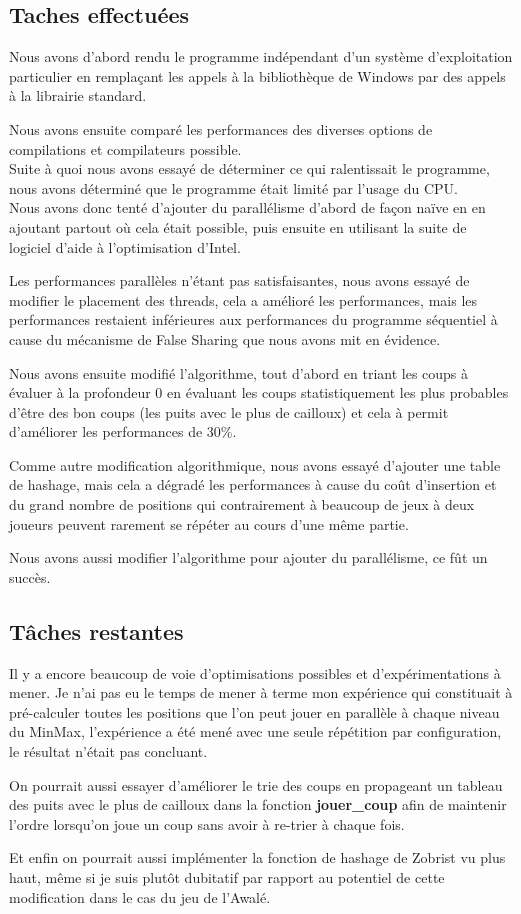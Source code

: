 \documentclass[
 aip,
 jmp,
 amsmath,amssymb,
 reprint
]{revtex4-1}
\begin{document}
\subsection{Taches effectuées}
Nous avons d'abord rendu le programme indépendant d'un système d'exploitation particulier en remplaçant les appels à la  bibliothèque de Windows par des appels à la librairie standard.\par
Nous avons ensuite comparé les performances des diverses options de compilations et compilateurs possible.\\
Suite à quoi nous avons essayé de déterminer ce qui ralentissait le programme, nous avons déterminé que le programme était limité par l'usage du CPU.\\
Nous avons donc tenté d'ajouter du parallélisme d'abord de façon naïve en en ajoutant partout où cela était possible, puis ensuite en utilisant la suite de logiciel d'aide à l'optimisation d'Intel.\par
Les performances parallèles n'étant pas satisfaisantes, nous avons essayé de modifier le placement des threads, cela a amélioré les performances, mais les performances restaient inférieures aux performances du programme séquentiel à cause du mécanisme de False Sharing\pageref{Fig:false_sharing} que nous avons mit en évidence.\par
Nous avons ensuite modifié l'algorithme, tout d'abord en triant les coups à évaluer à la profondeur 0 en évaluant les coups statistiquement les plus probables d'être des bon coups (les puits avec le plus de cailloux) et cela à permit d'améliorer les performances de 30\%.\par
Comme autre modification algorithmique, nous avons essayé d'ajouter une table de hashage, mais cela a dégradé les performances à cause du coût d'insertion et du grand nombre de positions qui contrairement à beaucoup de jeux à deux joueurs peuvent rarement se répéter au cours d'une même partie.\par
Nous avons aussi modifier l'algorithme pour ajouter du parallélisme, ce fût un succès.

\subsection{Tâches restantes}
Il y a encore beaucoup de voie d'optimisations possibles et d'expérimentations à mener. Je n'ai pas eu le temps de mener à terme mon expérience qui constituait à pré-calculer toutes les positions que l'on peut jouer en parallèle à chaque niveau du MinMax\pageref{Fig:alpha_beta}, l'expérience a été mené avec une seule répétition par configuration, le résultat n'était pas concluant.\par
On pourrait aussi essayer d'améliorer le trie des coups en propageant un tableau des puits avec le plus de cailloux dans la fonction \textbf{jouer\_coup} afin de maintenir l'ordre lorsqu'on joue un coup sans avoir à re-trier à chaque fois.\par
Et enfin on pourrait aussi implémenter la fonction de hashage de Zobrist vu plus haut, même si je suis plutôt dubitatif par rapport au potentiel de cette modification dans le cas du jeu de l'Awalé\pageref{Fig:awale}.
\end{document}
